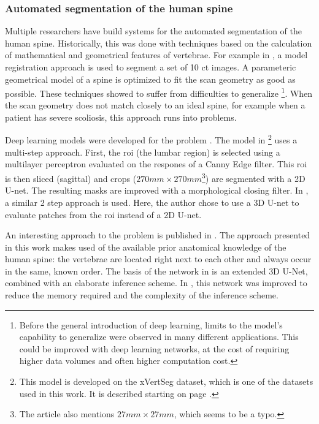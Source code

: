\subsubsection{Automated segmentation of the human spine}
\par{
    Multiple researchers have build systems for the automated segmentation of the human spine.
    Historically, this was done with techniques based on the calculation of mathematical and geometrical features of vertebrae. 
    For example in \cite{Klinder2008}, a model registration approach is used to segment a set of 10 \acrshort{ct} images.
    A parameteric geometrical model of a spine is optimized to fit the scan geometry as good as possible.
    These techniques showed to suffer from difficulties to generalize
    \footnote{Before the general introduction of deep learning, limits to the model's capability to generalize were observed in many different applications.
    This could be improved with deep learning networks, at the cost of requiring higher data volumes and often higher computation cost.}. 
    When the scan geometry does not match closely to an ideal spine, for example when a patient has severe scoliosis, this approach runs into problems.
}
\par{
    Deep learning models were developed for the problem \cite{Sekuboyina2017, Janssens, Chuang2019, Lessmann2018}.
    The model in \cite{Sekuboyina2017}\footnote{This model is developed on the xVertSeg dataset, which is one of the datasets used in this work. It is described starting on page \pageref{sec:xVertSeg}.} 
    uses a multi-step approach. First, the \acrfull{roi} (the lumbar region) is selected using a multilayer perceptron evaluated on the respones of a Canny Edge filter.
    This \acrshort{roi} is then sliced (sagittal) and crops ($270mm \times 270mm$\footnote{The article also mentions $27mm \times 27mm$, which seems to be a typo.}) are segmented with a 2D U-net. 
    The resulting masks are improved with a morphological closing filter. 
    In \cite{Janssens2018}, a similar 2 step approach is used. Here, the author chose to use a 3D U-net to evaluate patches from the \acrshort{roi} instead of a 2D U-net.
}
\par{
    An interesting approach to the problem is published in \cite{Lessmann2018, Chuang2019}. 
    The approach presented in this work makes used of the available prior anatomical knowledge of the human spine: 
    the vertebrae are located right next to each other and always occur in the same, known order.  
    The basis of the network in \cite{Lessmann2018} is an extended 3D U-Net, combined with an elaborate inference scheme.
    In \cite{Chuang2019}, this network was improved to reduce the memory required and the complexity of the inference scheme.
}
